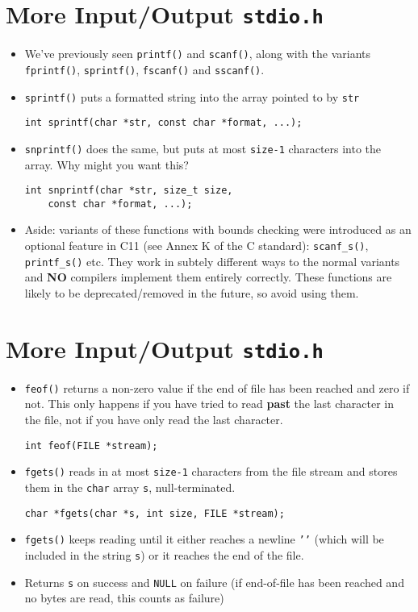 \documentclass{article}
\begin{document}
\section{More Input/Output \texttt{stdio.h}}
\begin{itemize}
\item We've previously seen \texttt{printf()} and \texttt{scanf()}, along with the variants \texttt{fprintf()}, \texttt{sprintf()}, \texttt{fscanf()} and \texttt{sscanf()}.
\item \texttt{sprintf()} puts a formatted string into the array pointed to by \texttt{str}
\begin{verbatim}
int sprintf(char *str, const char *format, ...);
\end{verbatim}
\item \texttt{snprintf()} does the same, but puts at most \texttt{size-1} characters into the array. Why might you want this?
\begin{verbatim}
int snprintf(char *str, size_t size,
    const char *format, ...);
\end{verbatim}
\item Aside: variants of these functions with bounds checking were introduced as an optional feature in C11 (see Annex K of the C standard): \texttt{scanf_s()}, \texttt{printf_s()} etc. They work in subtely different ways to the normal variants and \textbf{NO} compilers implement them entirely correctly. These functions are likely to be deprecated/removed in the future, so avoid using them.
\end{itemize}



\section{More Input/Output \texttt{stdio.h}}
\begin{itemize}
\item \texttt{feof()} returns a non-zero value if the end of file has been reached and zero if not. This only happens if you have tried to read \textbf{past} the last character in the file, not if you have only read the last character.
\begin{verbatim}
int feof(FILE *stream);
\end{verbatim}
\item \texttt{fgets()} reads in at most \texttt{size-1} characters from the file stream and stores them in the \texttt{char} array \texttt{s}, null-terminated.
\begin{verbatim}
char *fgets(char *s, int size, FILE *stream);
\end{verbatim}
\item \texttt{fgets()} keeps reading until it either reaches a newline \texttt{'\n'} (which will be included in the string \texttt{s}) or it reaches the end of the file.
\item Returns \texttt{s} on success and \texttt{NULL} on failure (if end-of-file has been reached and no bytes are read, this counts as failure)
\end{itemize}
\end{document}
